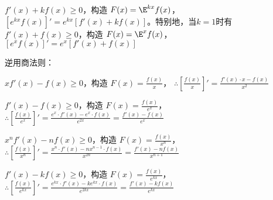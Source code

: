 $f'(x) + k f(x) \geq 0$，构造 $F(x) = \E^{kx} f(x)$，$[e^{kx} f(x)]' = e^{kx} [f'(x) + kf(x)]$。特别地，当$k=1$时有$f'(x) + f(x) \geq 0$，构造 $F(x) = \E^x f(x)$，$[e^x f(x)]' = e^x [f'(x) + f(x)]$

逆用商法则：

$xf'(x) - f(x) \geq 0$，构造 $F(x) = \frac{f(x)}{x}$，  
    $\therefore \left[\frac{f(x)}{x}\right]' = \frac{f'(x) \cdot x - f(x)}{x^2}$

$f'(x) - f(x) \geq 0$，构造 $F(x) = \frac{f(x)}{e^x}$，  
    $\therefore \left[\frac{f(x)}{e^x}\right]' = \frac{e^x \cdot f'(x) - e^x \cdot f(x)}{e^{2x}} = \frac{f'(x) - f(x)}{e^x}$

$x^n f'(x) - n f(x) \geq 0$，构造 $F(x) = \frac{f(x)}{x^n}$，  
    $\therefore \left[\frac{f(x)}{x^n}\right]' = \frac{x^n \cdot f'(x) - n x^{n-1} \cdot f(x)}{x^{2n}} = \frac{f'(x) - n f(x)}{x^{n+1}}$

$f'(x) - k f(x) \geq 0$，构造 $F(x) = \frac{f(x)}{e^{kx}}$，  
    $\therefore \left[\frac{f(x)}{e^{kx}}\right]' = \frac{e^{kx} \cdot f'(x) - k e^{kx} \cdot f(x)}{e^{2kx}} = \frac{f'(x) - k f(x)}{e^{kx}}$
